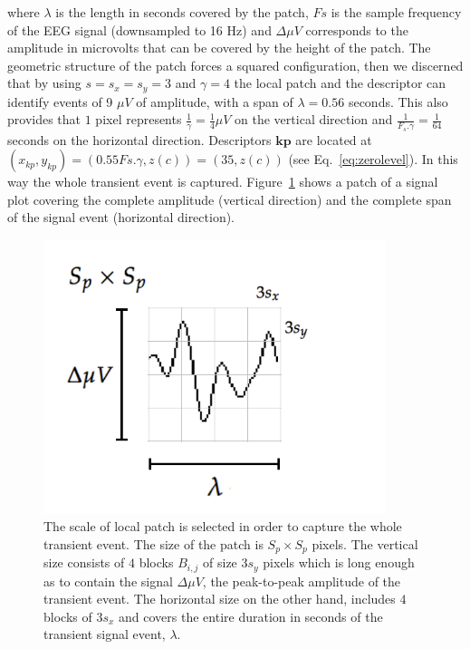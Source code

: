 \documentclass[entropy,article,submit,moreauthors,pdftex,10pt,a4paper]{mdpi}
\begin{document}
\noindent where $ \lambda $ is the length in seconds covered by the patch, $ Fs $ is the sample frequency of the EEG signal (downsampled to 16 Hz) and  $\Delta  \mu V $ corresponds to the amplitude in microvolts that can be covered by the height of the patch. The geometric structure of the patch forces a squared configuration, then we discerned that by using $ s =s_x =s_y = 3 $ and $ \gamma = 4 $  the local patch and the descriptor can identify events of 9 $ \mu V $ of amplitude, with a span of $ \lambda = 0.56$ seconds.  This also provides that $ 1 $ pixel represents $ \frac{1}{\gamma}= \frac{1}{4} \mu V $ on the vertical direction and $\frac{1}{F_s.\gamma}=\frac{1}{64}$ seconds on the horizontal direction. Descriptors  $\mathbf{kp}$  are located at $ (x_{kp}, y_{kp} )= ( 0.55 Fs.\gamma, z(c) )= (35,  z(c)) $ (see Eq.~\ref{eq:zerolevel}).   In this way the whole transient event is captured. 
Figure~\ref{fig:sampledescriptor2} shows a patch of a signal plot covering the complete amplitude (vertical direction) and the complete span of the signal event (horizontal direction). 

\begin{figure}[H]
\centering
\includegraphics[width=10cm]{patchgeometry.pdf}
\caption{The scale of local patch is selected in order to capture the whole transient event.  The size of the patch is $S_p \times S_p$ pixels. The vertical size consists of $4$ blocks $B_{i,j}$  of size $3 s_y$ pixels which is long enough as to contain the signal $\Delta  \mu V $, the peak-to-peak amplitude of the transient event. The horizontal size on the other hand, includes $4$ blocks  of $3 s_x$ and covers the entire duration in seconds of the transient signal event, $ \lambda $.   }

\label{fig:sampledescriptor2}
\end{figure}
\end{document}
